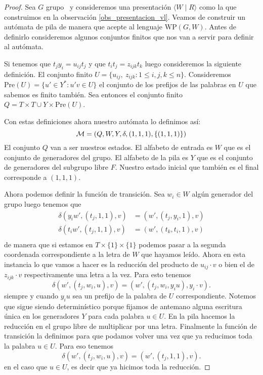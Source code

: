 \documentclass[tesis.tex]{subfiles}
\begin{document}
\begin{proof}
	Sea $G$ grupo \vl  \ y consideremos una presentación $\langle W  \mid  R \rangle$ como la que construimos en la observación \ref{obs_presentacion_vl}.
	Veamos de construir un autómata de pila de manera que acepte al lenguaje $\text{WP}(G,W)$.
	Antes de definirlo consideremos algunos conjuntos finitos que nos van a servir para definir al autómata.
	
	Si tenemos que $ t_j y_i = u_{ij} t_j $ y que $ t_it_j = z_{ijk}t_k $ luego consideremos la siguiente definición.
	El conjunto finito $U = \{ u_{ij}, \ z_{ijk} : 1 \le i,j,k \le n \}$.
	Consideremos $\text{Pre}(U) = \{ u' \in Y^* : u'v \in U  \}$ el conjunto de los prefijos de las palabras en $U$ que sabemos es finito también.	
	Sea entonces el conjunto finito $Q = T \times T \cup Y \times \text{Pre}(U) $.
	
	Con estas definiciones ahora nuestro autómata lo definimos así: 
	\[
	{\cal M }= (Q, W , Y, \delta, (1,1,1), \{(1,1,1)\})
	\]
	El conjunto $Q$ van a ser nuestros estados.
	El alfabeto de entrada es $W$ que es el conjunto de generadores del grupo.
	El alfabeto de la pila es $Y$ que es el conjunto de generadores del subgrupo libre $F$.
	Nuestro estado inicial que también es el final corresponde a $(1,1,1)$.
	
	Ahora podemos definir la función de transición. 
	Sea $w_i \in W$ algún generador del grupo luego tenemos que
	\begin{align*}
		\delta(y_iw',(t_j,1,1), v) &= (w', (t_j,y_i,1), v) \\
		\delta(t_iw',(t_j,1,1), v) &= (w', (t_k,t_i,1), v) \\
	\end{align*}
	de manera que si estamos en $T \times \{ 1 \} \times \{ 1 \}$ podemos pasar a la segunda coordenada correspondiente a la letra de $W$ que hayamos leído.	
	Ahora en esta instancia lo que vamos a hacer es la reducción del producto de $u_{ij} \cdot v$ o bien el de $z_{ijk} \cdot v$ respectivamente una letra a la vez.
	Para esto tenemos
	\begin{equation*}
		\delta(w',(t_j,w_i,u), v) = (w', (t_j,w_i,y_iu), y_i \cdot v) .
	\end{equation*}
	siempre y cuando $y_iu$ sea un prefijo de la palabra de $U$ correspondiente.
	Notemos que sigue siendo determinístico porque fijamos de antemano alguna escritura única en los generadores $Y$ para cada palabra $u \in U$.
	En la pila hacemos la reducción en el grupo libre de multiplicar por una letra.
	Finalmente la función de transición la definimos para que podamos volver una vez que ya reducimos toda la palabra $u \in U$.
	Para eso tenemos 
	\begin{equation*}
		\delta(w',(t_j,w_i,u), v) = (w', (t_j,1,1), v).		
	\end{equation*}
	en el caso que $u \in U$, es decir que ya hicimos toda la reducción.
	

\end{proof}
\end{document}
